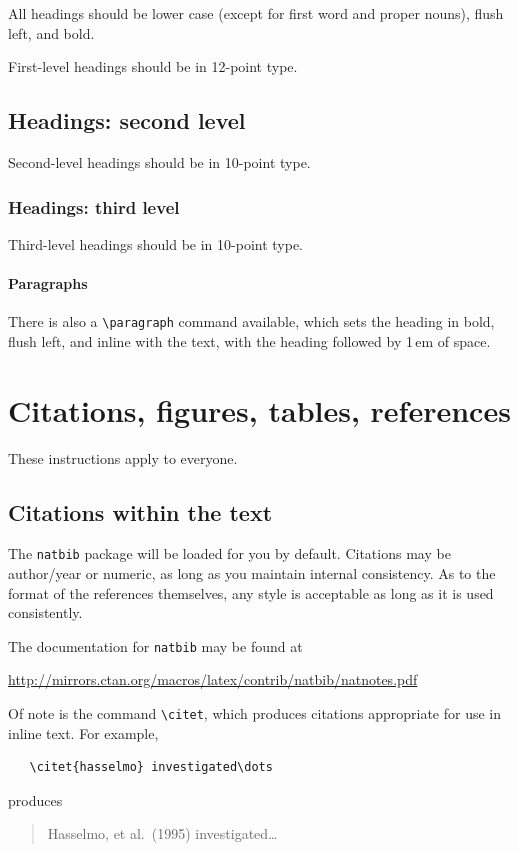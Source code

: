 \documentclass{article}
\begin{document}
All headings should be lower case (except for first word and proper nouns),
flush left, and bold.


First-level headings should be in 12-point type.


\subsection{Headings: second level}


Second-level headings should be in 10-point type.


\subsubsection{Headings: third level}


Third-level headings should be in 10-point type.


\paragraph{Paragraphs}


There is also a \verb+\paragraph+ command available, which sets the heading in
bold, flush left, and inline with the text, with the heading followed by 1\,em
of space.


\section{Citations, figures, tables, references}
\label{others}


These instructions apply to everyone.


\subsection{Citations within the text}


The \verb+natbib+ package will be loaded for you by default.  Citations may be
author/year or numeric, as long as you maintain internal consistency.  As to the
format of the references themselves, any style is acceptable as long as it is
used consistently.


The documentation for \verb+natbib+ may be found at
\begin{center}
  \url{http://mirrors.ctan.org/macros/latex/contrib/natbib/natnotes.pdf}
\end{center}
Of note is the command \verb+\citet+, which produces citations appropriate for
use in inline text.  For example,
\begin{verbatim}
   \citet{hasselmo} investigated\dots
\end{verbatim}
produces
\begin{quote}
  Hasselmo, et al.\ (1995) investigated\dots
\end{quote}
\end{document}
